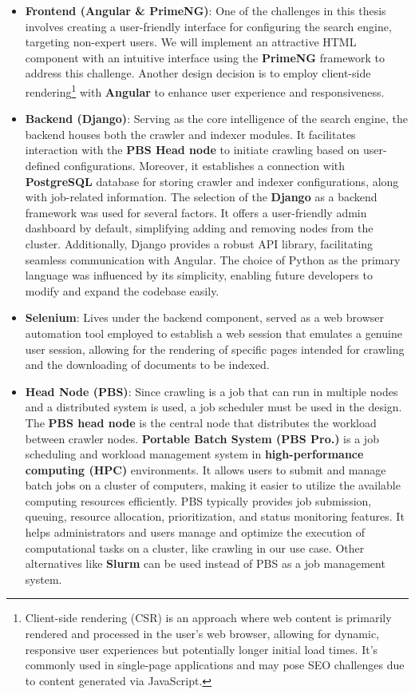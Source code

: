 \begin{itemize}
  \item[] \textbf{Frontend (Angular \& PrimeNG)}: One of the challenges in this thesis involves creating a user-friendly interface for configuring the search engine, targeting non-expert users. We will implement an attractive HTML component with an intuitive interface using the \textbf{PrimeNG} framework to address this challenge. Another design decision is to employ client-side rendering\footnote{Client-side rendering (CSR) is an approach where web content is primarily rendered and processed in the user's web browser, allowing for dynamic, responsive user experiences but potentially longer initial load times. It's commonly used in single-page applications and may pose SEO challenges due to content generated via JavaScript.} with \textbf{Angular} to enhance user experience and responsiveness.
  \item[] \textbf{Backend (Django)}: Serving as the core intelligence of the search engine, the backend houses both the crawler and indexer modules. It facilitates interaction with the \textbf{PBS Head node} to initiate crawling based on user-defined configurations. Moreover, it establishes a connection with \textbf{PostgreSQL} database for storing crawler and indexer configurations, along with job-related information. The selection of the \textbf{Django} as a backend framework was used for several factors. It offers a user-friendly admin dashboard by default, simplifying adding and removing nodes from the cluster. Additionally, Django provides a robust API library, facilitating seamless communication with Angular. The choice of Python as the primary language was influenced by its simplicity, enabling future developers to modify and expand the codebase easily.
  \item[] \textbf{Selenium}: Lives under the backend component, served as a web browser automation tool employed to establish a web session that emulates a genuine user session, allowing for the rendering of specific pages intended for crawling and the downloading of documents to be indexed.
  \item[] \textbf{Head Node (PBS)}: Since crawling is a job that can run in multiple nodes and a distributed system is used, a job scheduler must be used in the design. The \textbf{PBS head node} is the central node that distributes the workload between crawler nodes. \textbf{Portable Batch System (PBS Pro.)} is a job scheduling and workload management system in \textbf{high-performance computing (HPC)} environments. It allows users to submit and manage batch jobs on a cluster of computers, making it easier to utilize the available computing resources efficiently. PBS typically provides job submission, queuing, resource allocation, prioritization, and status monitoring features. It helps administrators and users manage and optimize the execution of computational tasks on a cluster, like crawling in our use case. Other alternatives like \textbf{Slurm} can be used instead of PBS as a job management system.

\end{itemize}
